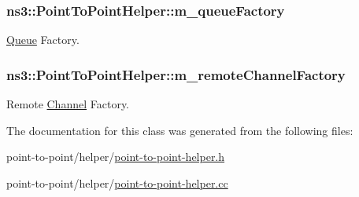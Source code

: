 \subsubsection[{\texorpdfstring{m\+\_\+queue\+Factory}{m_queueFactory}}]{ ns3\+::\+Point\+To\+Point\+Helper\+::m\+\_\+queue\+Factory\hspace{0.3cm}{\ttfamily [private]}}\hypertarget{classns3_1_1PointToPointHelper_a79d2da8ad9d40adc181d4c1b8520890f}{}\label{classns3_1_1PointToPointHelper_a79d2da8ad9d40adc181d4c1b8520890f}


\hyperlink{classns3_1_1Queue}{Queue} Factory. 

\subsubsection[{\texorpdfstring{m\+\_\+remote\+Channel\+Factory}{m_remoteChannelFactory}}]{ ns3\+::\+Point\+To\+Point\+Helper\+::m\+\_\+remote\+Channel\+Factory\hspace{0.3cm}{\ttfamily [private]}}\hypertarget{classns3_1_1PointToPointHelper_a96abd585304725f9ad2810503f795039}{}\label{classns3_1_1PointToPointHelper_a96abd585304725f9ad2810503f795039}


Remote \hyperlink{classns3_1_1Channel}{Channel} Factory. 



The documentation for this class was generated from the following files\+:\begin{DoxyCompactItemize}
\item 
point-\/to-\/point/helper/\hyperlink{point-to-point-helper_8h}{point-\/to-\/point-\/helper.\+h}\item 
point-\/to-\/point/helper/\hyperlink{point-to-point-helper_8cc}{point-\/to-\/point-\/helper.\+cc}\end{DoxyCompactItemize}
